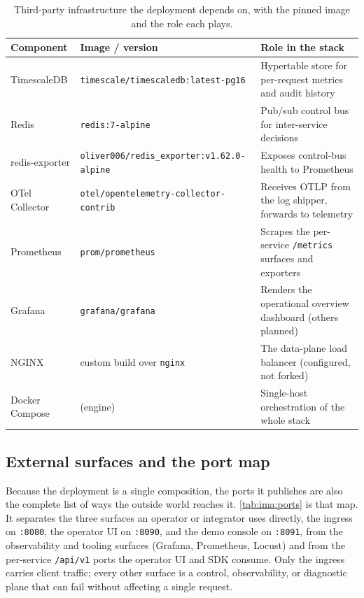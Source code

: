 \begin{table}[H]
\centering
\caption[Third-party infrastructure dependencies]{Third-party infrastructure the deployment depends on, with the pinned image and the role each plays.}
\label{tab:ima:thirdparty}
\small
\begin{tabularx}{\linewidth}{@{}l l Y@{}}
\toprule
\textbf{Component} & \textbf{Image / version} & \textbf{Role in the stack} \\
\midrule
TimescaleDB    & \texttt{timescale/timescaledb:latest-pg16} & Hypertable store for per-request metrics and audit history \\
Redis          & \texttt{redis:7-alpine}                    & Pub/sub control bus for inter-service decisions \\
redis-exporter & \texttt{oliver006/redis\_exporter:v1.62.0-alpine} & Exposes control-bus health to Prometheus \\
OTel Collector & \texttt{otel/opentelemetry-collector-contrib} & Receives OTLP from the log shipper, forwards to telemetry \\
Prometheus     & \texttt{prom/prometheus}                   & Scrapes the per-service \texttt{/metrics} surfaces and exporters \\
Grafana        & \texttt{grafana/grafana}                   & Renders the operational overview dashboard (others planned) \\
NGINX          & custom build over \texttt{nginx}           & The data-plane load balancer (configured, not forked) \\
Docker Compose & (engine)                                   & Single-host orchestration of the whole stack \\
\bottomrule
\end{tabularx}
\end{table}

\subsection{External surfaces and the port map}
\label{sec:ima:ports}

Because the deployment is a single composition, the ports it publishes are also the
complete list of ways the outside world reaches it. \cref{tab:ima:ports} is that
map. It separates the three surfaces an operator or integrator uses directly, the
ingress on \texttt{:8080}, the operator UI on \texttt{:8090}, and the demo console
on \texttt{:8091}, from the observability and tooling surfaces (Grafana,
Prometheus, Locust) and from the per-service \texttt{/api/v1} ports the operator UI
and SDK consume. Only the ingress carries client traffic; every other surface is a
control, observability, or diagnostic plane that can fail without affecting a
single request.

